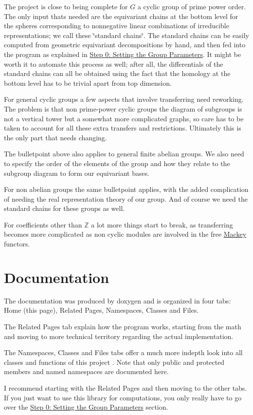 \begin{DoxyItemize}
\item The project is close to being complete for $G$ a cyclic group of prime power order. The only input that\textquotesingle{}s needed are the equivariant chains at the bottom level for the spheres corresponding to nonnegative linear combinations of irreducible representations; we call these \char`\"{}standard chains\char`\"{}. The standard chains can be easily computed from geometric equivariant decompositions by hand, and then fed into the program as explained in \hyperlink{use_how}{Step 0\+: Setting the Group Parameters}. It might be worth it to automate this process as well; after all, the differentials of the standard chains can all be obtained using the fact that the homology at the bottom level has to be trivial apart from top dimension.
\item For general cyclic groups a few aspects that involve transferring need reworking. The problem is that non prime-\/power cyclic groups the diagram of subgroups is not a vertical tower but a somewhat more complicated graphs, so care has to be taken to account for all these extra transfers and restrictions. Ultimately this is the only part that needs changing.
\item The bulletpoint above also applies to general finite abelian groups. We also need to specify the order of the elements of the group and how they relate to the subgroup diagram to form our equivariant bases.
\item For non abelian groups the same bulletpoint applies, with the added complication of needing the real representation theory of our group. And of course we need the standard chains for these groups as well.
\item For coefficients other than $\mathbb Z$ a lot more things start to break, as transferring becomes more complicated as non cyclic modules are involved in the free \hyperlink{namespaceMackey}{Mackey} functors.
\end{DoxyItemize}\hypertarget{index_doc}{}\section{Documentation}\label{index_doc}
The documentation was produced by doxygen and is organized in four tabs\+: Home (this page), Related Pages, Namespaces, Classes and Files.


\begin{DoxyItemize}
\item The Related Pages tab explain how the program works, starting from the math and moving to more technical territory regarding the actual implementation.
\item The Namespaces, Classes and Files tabs offer a much more indepth look into all classes and functions of this project . Note that only public and protected members and named namespaces are documented here.
\end{DoxyItemize}

I recommend starting with the Related Pages and then moving to the other tabs. If you just want to use this library for computations, you only really have to go over the \hyperlink{use_how}{Step 0\+: Setting the Group Parameters} section. 